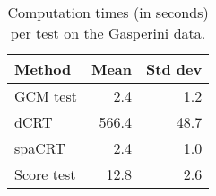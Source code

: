 \begin{table}[!h]
\centering
\caption{\label{tab:time_comparison}Computation times (in seconds) per test on the Gasperini data.}
\centering
\begin{tabular}[t]{lrr}
\toprule
Method & Mean & Std dev\\
\midrule
GCM test & 2.4 & 1.2\\
dCRT & 566.4 & 48.7\\
spaCRT & 2.4 & 1.0\\
Score test & 12.8 & 2.6\\
\bottomrule
\end{tabular}
\end{table}
